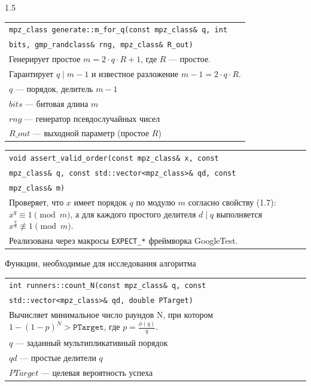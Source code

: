 \documentclass[14pt,a4paper]{extarticle}
\begin{document}
\begin{spacing}{1.5}
\vspace{0.2cm}
\noindent\begin{tabularx}{\textwidth}{|X|}
\hline
\texttt{mpz\_class generate::m\_for\_q(const mpz\_class\& q, int}\\
\texttt{bits, gmp\_randclass\& rng, mpz\_class\& R\_out)} \\
\hline
Генерирует простое \(m = 2 \cdot q \cdot R + 1\), где \(R\) — простое. \\
Гарантирует \(q \mid m-1\) и известное разложение \(m-1 = 2 \cdot q \cdot R\). \\
\(q\) \hspace{0.8cm} — порядок, делитель \(m-1\) \\
\(bits\) \hspace{0.5cm} — битовая длина \(m\) \\
\(rng\) \hspace{0.5cm} — генератор псевдослучайных чисел \\
\(R\_out\) \hspace{0.2cm} — выходной параметр (простое \(R\)) \\
\hline
\end{tabularx}

\vspace{0.2cm}
\noindent\begin{tabularx}{\textwidth}{|X|}
\hline
\texttt{void assert\_valid\_order(const mpz\_class\& x, const}\\
\texttt{mpz\_class\& q, const std::vector<mpz\_class>\& qd, const}\\
\texttt{mpz\_class\& m)} \\
\hline
Проверяет, что \(x\) имеет порядок \(q\) по модулю \(m\) согласно свойству (1.7): \(x^q \equiv 1 \pmod m\), а для каждого простого делителя \(d \mid q\) выполняется \(x^{\frac{q}{d}} \not\equiv 1 \pmod m\). \\
Реализована через макросы \texttt{EXPECT\_*} фреймворка GoogleTest. \\
\hline
\end{tabularx}

\vspace{0.5cm}
\noindent Функции, необходимые для исследования алгоритма

\vspace{0.2cm}
\noindent\begin{tabularx}{\textwidth}{|X|}
\hline
\texttt{int runners::count\_N(const mpz\_class\& q, const}\\
\texttt{std::vector<mpz\_class>\& qd, double PTarget)} \\
\hline
Вычисляет минимальное число раундов N, при котором \(1 - (1 - p)^N > \texttt{PTarget}\), где \(p = \frac{\phi(q)}{q}\). \\
\(q\) \hspace{1.2cm} — заданный мультипликативный порядок \\
\(qd\) \hspace{1cm} — простые делители \(q\) \\
\(PTarget\) — целевая вероятность успеха \\
\hline
\end{tabularx}


\end{spacing}
\end{document}
